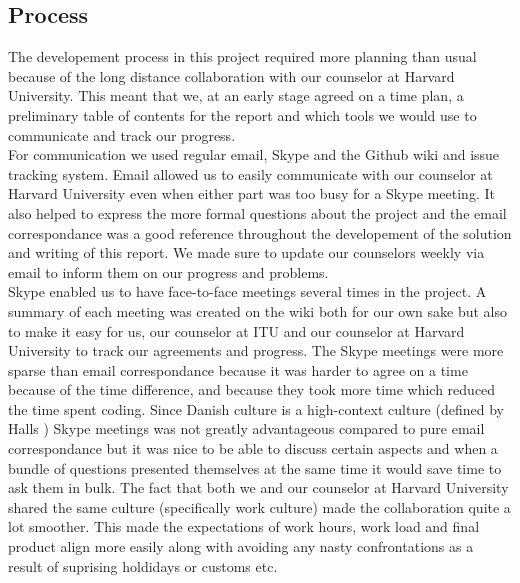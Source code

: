 
\subsection{Process}
\label{process}


The developement process in this project required more planning than usual because of the long distance collaboration with our counselor at Harvard University. This meant that we, at an early stage agreed on a time plan, a preliminary table of contents for the report and which tools we would use to communicate and track our progress. \\

For communication we used regular email, Skype and the Github \cite{github} wiki and issue tracking system. Email allowed us to easily communicate with our counselor at Harvard University even when either part was too busy for a Skype meeting. It also helped to express the more formal questions about the project and the email correspondance was a good reference throughout the developement of the solution and writing of this report. We made sure to update our counselors weekly via email to inform them on our progress and problems.\\

Skype enabled us to have face-to-face meetings several times in the project. A summary of each meeting was created on the wiki both for our own sake but also to make it easy for us, our counselor at ITU and our counselor at Harvard University to track our agreements and progress. The Skype meetings were more sparse than email correspondance because it was harder to agree on a time because of the time difference, and because they took more time which reduced the time spent coding. Since Danish culture is a high-context culture (defined by Halls \cite{halls}) Skype meetings was not greatly advantageous compared to pure email correspondance but it was nice to be able to discuss certain aspects and when a bundle of questions presented themselves at the same time it would save time to ask them in bulk. The fact that both we and our counselor at Harvard University shared the same culture (specifically work culture) made the collaboration quite a lot smoother. This made the expectations of work hours, work load and final product align more easily along with avoiding any nasty confrontations as a result of suprising holdidays or customs etc. \\


